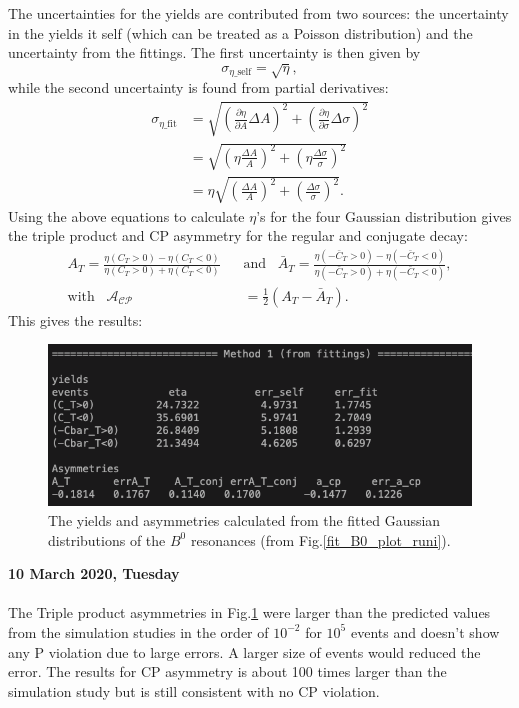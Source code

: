 The uncertainties for the yields are contributed from two sources: the uncertainty in the yields it self (which can be treated as a Poisson distribution) and the uncertainty from the fittings. The first uncertainty is then given by
\begin{equation}
    \sigma_{\eta\text{\_self}} = \sqrt{\eta},
\end{equation}
while the second uncertainty is found from partial derivatives:
\begin{align}
    \sigma_{\eta\text{\_fit}} &= \sqrt{\left(\frac{\partial\eta}{\partial A}\Delta A\right)^2 + \left(\frac{\partial\eta}{\partial \sigma}\Delta\sigma\right)^2}   \nonumber\\
                  &= \sqrt{\left(\eta\frac{\Delta A}{A}\right)^2+\left(\eta\frac{\Delta \sigma}{\sigma}\right)^2}  \nonumber\\
                  &= \eta \sqrt{\left(\frac{\Delta A}{A}\right)^2+\left(\frac{\Delta \sigma}{\sigma}\right)^2}.
\end{align}
Using the above equations to calculate $\eta$'s for the four Gaussian distribution gives the triple product and CP asymmetry for the regular and conjugate decay:
\begin{align}
    A_T = \frac{\eta(C_T>0)-\eta(C_T<0)}{\eta(C_T>0)+\eta(C_T<0)} \;\;\;&\text{and}\;\;\;
    \bar{A}_T = \frac{\eta(-\bar{C}_T>0)-\eta(-\bar{C}_T<0)}{\eta(-\bar{C}_T>0)+\eta(-\bar{C}_T<0)},\\
    \text{with}\;\;\;\mathcal{A}_{\mathcal{C}\mathcal{P}} &= \frac{1}{2}(A_T-\bar{A}_T).
    \label{asymmetry_yield}
\end{align}
This gives the results:
\begin{figure}[h]
\center
\includegraphics*[width=0.76\linewidth]{LHCb_runI/B0_yields_asy}
\caption{The yields and asymmetries calculated from the fitted Gaussian distributions of the $B^0$ resonances (from Fig.\ref{fit_B0_plot_runi}).}
\label{B0_yields_asy_1}
\end{figure}
\clearpage
\noindent\textbf{10 March 2020, Tuesday}
\\
\\
The Triple product asymmetries in Fig.\ref{B0_yields_asy_1} were larger than the predicted values from the simulation studies in the order of $10^{-2}$ for $10^5$ events and doesn't show any P violation due to large errors. A larger size of events would reduced the error. The results for CP asymmetry is about 100 times larger than the simulation study but is still consistent with no CP violation.
